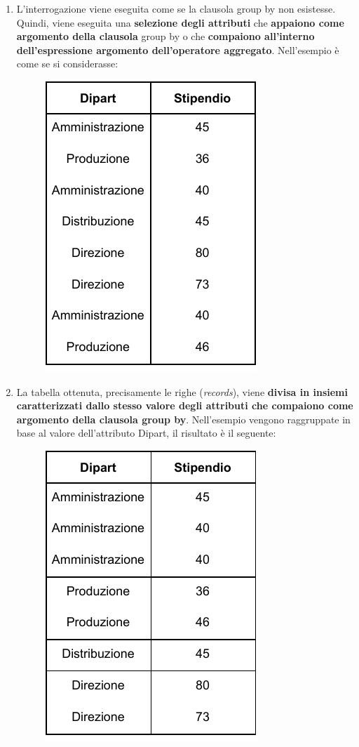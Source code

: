 \documentclass[a4paper]{article}
\begin{document}
	\begin{enumerate}
		\item L'interrogazione viene eseguita come se la clausola \textsf{group by} non esistesse. Quindi, viene eseguita una \textbf{selezione degli attributi} che \textbf{appaiono come argomento della clausola} \textsf{group by} o che \textbf{compaiono all'interno dell'espressione argomento dell'operatore aggregato}.\newline
		Nell'esempio è come se si considerasse:
		
		\begin{figure}[!htp]
			\centering
			\includegraphics[width=.4\textwidth]{img/group-by-ex1.pdf}
		\end{figure}\newpage
	
		\item La tabella ottenuta, precisamente le righe (\emph{records}), viene \textbf{divisa in insiemi caratterizzati dallo stesso valore degli attributi che compaiono come argomento della clausola \textsf{group by}}.\newline
		Nell'esempio vengono raggruppate in base al valore dell'attributo \textsf{Dipart}, il risultato è il seguente:
		\begin{figure}[!htp]
			\centering
			\includegraphics[width=.4\textwidth]{img/group-by-ex2.pdf}
		\end{figure}
	

\end{enumerate}
\end{document}
